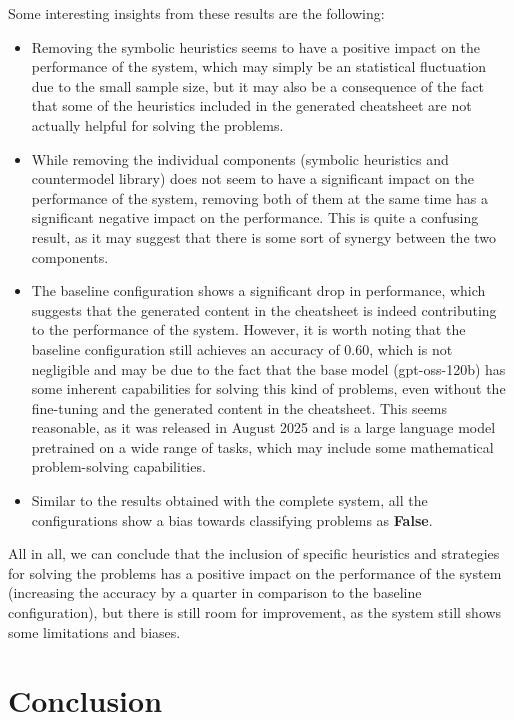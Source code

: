 \documentclass{article}
\begin{document}
Some interesting insights from these results are the following:
\begin{itemize}
  \item Removing the symbolic heuristics seems to have a positive impact on the performance of the system, which may simply be an statistical fluctuation due to the small sample size, but it may also be a consequence of the fact that some of the heuristics included in the generated cheatsheet are not actually helpful for solving the problems.
  \item While removing the individual components (symbolic heuristics and countermodel library) does not seem to have a significant impact on the performance of the system, removing both of them at the same time has a significant negative impact on the performance. This is quite a confusing result, as it may suggest that there is some sort of synergy between the two components.
  \item The baseline configuration shows a significant drop in performance, which suggests that the generated content in the cheatsheet is indeed contributing to the performance of the system. However, it is worth noting that the baseline configuration still achieves an accuracy of 0.60, which is not negligible and may be due to the fact that the base model (gpt-oss-120b)  has some inherent capabilities for solving this kind of problems, even without the fine-tuning and the generated content in the cheatsheet. This seems reasonable, as it was released in August 2025 and is a large language model pretrained on a wide range of tasks, which may include some mathematical problem-solving capabilities.
  \item Similar to the results obtained with the complete system, all the configurations show a bias towards classifying problems as \textbf{False}.
\end{itemize}

All in all, we can conclude that the inclusion of specific heuristics and strategies for solving the problems has a positive impact on the performance of the system (increasing the accuracy by a quarter in comparison to the baseline configuration), but there is still room for improvement, as the system still shows some limitations and biases.

\section{Conclusion}
\end{document}
